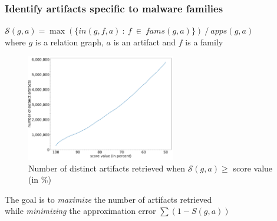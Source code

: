 \begin{frame}
    \frametitle{Identify artifacts specific to malware families}
    \centering

    $\mathcal{S}(\mathit{g}, \mathit{a}) = \max(\{in(\mathit{g}, \mathit{f}, \mathit{a})~ :~ f~ \in~ fams(\mathit{g}, \mathit{a})\})~ /~ apps(\mathit{g}, \mathit{a})$ \\
    \smallskip{}
    \small{
        where $\mathit{g}$ is a relation graph, $\mathit{a}$ is an artifact and $\mathit{f}$ is a family
    }

    \smallskip{}

    \begin{figure}[!ht]
        \includegraphics[width=0.58\textwidth]{figures/apgraph/parameters.pdf}
        \caption{
            \footnotesize{
                Number of distinct artifacts retrieved when $\mathcal{S}(\mathit{g}, \mathit{a}) \geq$ score value (in \%)
            }
        }
    \end{figure}

    \vspace{-10pt}

    The goal is to \textit{maximize} the number of artifacts retrieved \\
    while \textit{minimizing} the approximation error $\sum (1 - S(g, a))$

\end{frame}

